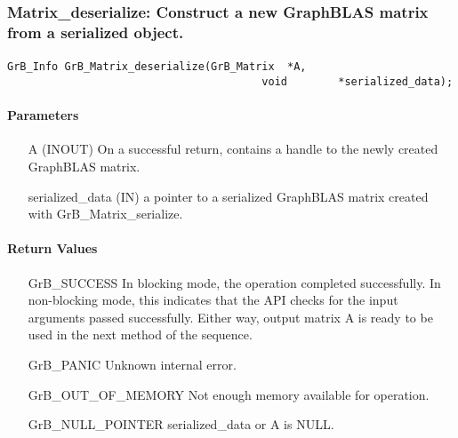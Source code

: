 \subsubsection{{\sf Matrix\_deserialize}: Construct a new GraphBLAS matrix from a serialized object. }
\label{Sec:Matrix_deserialize}

\paragraph{\syntax}

\begin{Verbatim}[samepage=true]
        GrB_Info GrB_Matrix_deserialize(GrB_Matrix  *A,
                                        void        *serialized_data);
\end{Verbatim}

\paragraph{Parameters}

\begin{itemize}[leftmargin=1.1in]
    \item[{\sf A}]      ({\sf INOUT}) On a successful return, contains a handle to the newly created GraphBLAS matrix.
    \item[{\sf serialized\_data}] ({\sf IN}) a pointer to a serialized GraphBLAS matrix created with {\sf GrB\_Matrix\_serialize}.
\end{itemize}
\paragraph{Return Values}

\begin{itemize}[leftmargin=2.3in]
    \item[{\sf GrB\_SUCCESS}]         In blocking mode, the operation completed
    successfully. In non-blocking mode, this indicates that the API checks 
    for the input arguments passed successfully. Either way, output matrix 
    {\sf A} is ready to be used in the next method of the sequence.

    \item[{\sf GrB\_PANIC}]           Unknown internal error.
    
    \item[{\sf GrB\_OUT\_OF\_MEMORY}] Not enough memory available for operation.
    
    \item[{\sf GrB\_NULL\_POINTER}]  {\sf serialized\_data} or {\sf A} is {\sf NULL}.
\end{itemize}


